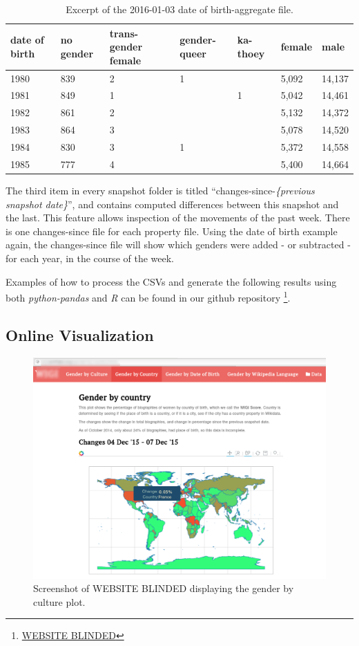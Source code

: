 \documentclass[letterpaper]{article}
\begin{document}
\begin{table}
\caption{Excerpt of the 2016-01-03 date of birth-aggregate file.}
\begin{tabular} {p{0.8cm}p{0.8cm}p{0.8cm}p{0.8cm}p{0.8cm}p{0.8cm}p{0.8cm}}
\toprule
date of birth & no gender & trans-gender female & gender-queer & ka-thoey & female & male \\
\midrule
1980 & 839 & 2 & 1 & & 5,092 & 14,137   \\ 
1981 & 849 & 1 &  & 1 &5,042 & 14,461 \\ 
1982 & 861 & 2 &  & &5,132 & 14,372  \\ 
1983 & 864 & 3 &  & &5,078 & 14,520  \\ 
1984 & 830 & 3 & 1 & &5,372 & 14,558   \\ 
1985 & 777 & 4 &  & &5,400 & 14,664  \\ 
\bottomrule
\end{tabular}
\label{table:dob}
\end{table}

The third item in every snapshot folder is titled ``changes-since-\textit{\{previous snapshot date\}}'', and contains computed differences between this snapshot and the last. This feature allows inspection of the movements of the past week. There is one changes-since file for each property file. Using the date of birth example again, the changes-since file will show which genders were added - or subtracted - for each year, in the course of the week.

Examples of how to process the CSVs and generate the following results using both \textit{python-pandas} and \textit{R} can be found in our github repository \footnote{\url{WEBSITE BLINDED}}.

\subsection{Online Visualization}

\begin{figure}
\includegraphics[scale=0.2]{figures/website_screenshot.png} 
\caption{Screenshot of WEBSITE BLINDED displaying the gender by culture plot.}
\label{fig:screenshot}
\end{figure}
\end{document}
